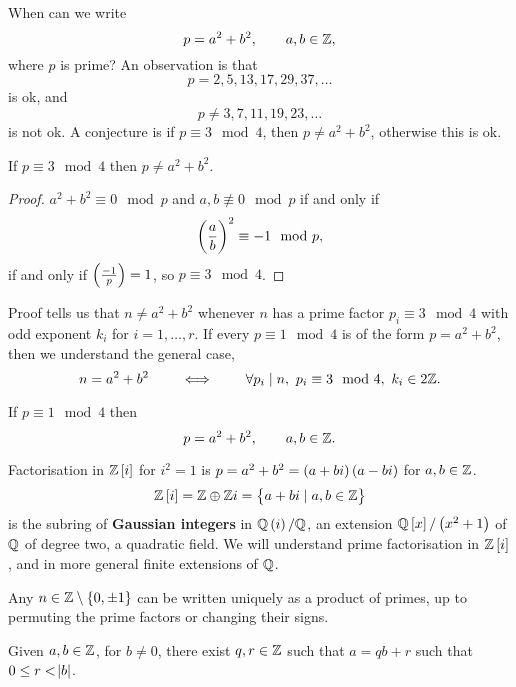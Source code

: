 When can we write
$$ p = a^2 + b^2, \qquad a, b \in \mathbb{Z}, $$
where $ p $ is prime? An observation is that
$$ p = 2, 5, 13, 17, 29, 37, \dots $$
is ok, and
$$ p \ne 3, 7, 11, 19, 23, \dots $$
is not ok. A conjecture is if $ p \equiv 3 \mod 4 $, then $ p \ne a^2 + b^2 $, otherwise this is ok.

\pagebreak

\begin{theorem}
If $ p \equiv 3 \mod 4 $ then $ p \ne a^2 + b^2 $.
\end{theorem}

\begin{proof}
$ a^2 + b^2 \equiv 0 \mod p $ and $ a, b \not\equiv 0 \mod p $ if and only if
$$ \br{\dfrac{a}{b}}^2 \equiv -1 \mod p, $$
if and only if $ \jacobi{-1}{p} = 1 $, so $ p \equiv 3 \mod 4 $.
\end{proof}

\begin{remark*}
Proof tells us that $ n \ne a^2 + b^2 $ whenever $ n $ has a prime factor $ p_i \equiv 3 \mod 4 $ with odd exponent $ k_i $ for $ i = 1, \dots, r $. If every $ p \equiv 1 \mod 4 $ is of the form $ p = a^2 + b^2 $, then we understand the general case,
$$ n = a^2 + b^2 \qquad \iff \qquad \forall p_i \mid n, \ p_i \equiv 3 \mod 4, \ k_i \in 2\mathbb{Z}. $$
\end{remark*}

\begin{theorem}
If $ p \equiv 1 \mod 4 $ then
$$ p = a^2 + b^2, \qquad a, b \in \mathbb{Z}. $$
\end{theorem}

Factorisation in $ \Z\sbr{i} $ for $ i^2 = 1 $ is $ p = a^2 + b^2 = \br{a + bi}\br{a - bi} $ for $ a, b \in \mathbb{Z} $.
$$ \Z\sbr{i} = \Z \oplus \Z i = \cbr{a + bi \mid a, b \in \Z} $$
is the subring of \textbf{Gaussian integers} in $ \Q\br{i} / \Q $, an extension $ \Q\sbr{x} / \br{x^2 + 1} $ of $ \mathbb{Q} $ of degree two, a quadratic field. We will understand prime factorisation in $ \Z\sbr{i} $, and in more general finite extensions of $ \mathbb{Q} $.

\begin{theorem}
\label{thm:uniquefactorisationinz}
Any $ n \in \Z \setminus \cbr{0, \pm 1} $ can be written uniquely as a product of primes, up to permuting the prime factors or changing their signs.
\end{theorem}

\begin{proposition}
Given $ a, b \in \mathbb{Z} $, for $ b \ne 0 $, there exist $ q, r \in \mathbb{Z} $ such that $ a = qb + r $ such that $ 0 \le r < \abs{b} $.
\end{proposition}

